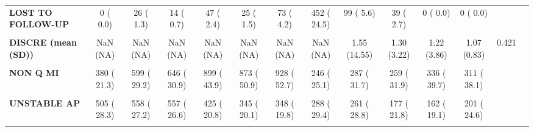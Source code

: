 \documentclass[
]{article}
\begin{document}
\begin{table}[H]
\begin{tabular}[t]{>{\raggedright\arraybackslash}p{5em}ccccccccccccc}
\textbf{LOST TO FOLLOW-UP} & 0 (  0.0) & 26 (  1.3) & 14 (  0.7) & 47 (  2.4) & 25 (  1.5) & 73 (  4.2) & 452 ( 24.5) & 99 (  5.6) & 39 (  2.7) & 0 (  0.0) & 0 (  0.0) &  & \\
\textbf{\cellcolor{gray!10}{STILL IN HOSPITAL}} & \cellcolor{gray!10}{59 (  3.7)} & \cellcolor{gray!10}{64 (  3.2)} & \cellcolor{gray!10}{41 (  2.1)} & \cellcolor{gray!10}{50 (  2.5)} & \cellcolor{gray!10}{16 (  0.9)} & \cellcolor{gray!10}{20 (  1.1)} & \cellcolor{gray!10}{22 (  1.2)} & \cellcolor{gray!10}{30 (  1.7)} & \cellcolor{gray!10}{17 (  1.2)} & \cellcolor{gray!10}{5 (  0.3)} & \cellcolor{gray!10}{8 (  0.7)} & \cellcolor{gray!10}{} & \cellcolor{gray!10}{}\\
\textbf{DISCRE (mean (SD))} & NaN (NA) & NaN (NA) & NaN (NA) & NaN (NA) & NaN (NA) & NaN (NA) & NaN (NA) & 1.55 (14.55) & 1.30 (3.22) & 1.22 (3.86) & 1.07 (0.83) & 0.421 & \\
\textbf{\cellcolor{gray!10}{DISDIA (\%)}} & \cellcolor{gray!10}{} & \cellcolor{gray!10}{} & \cellcolor{gray!10}{} & \cellcolor{gray!10}{} & \cellcolor{gray!10}{} & \cellcolor{gray!10}{} & \cellcolor{gray!10}{} & \cellcolor{gray!10}{} & \cellcolor{gray!10}{} & \cellcolor{gray!10}{} & \cellcolor{gray!10}{} & \cellcolor{gray!10}{<0.001} & \cellcolor{gray!10}{}\\
\textbf{NON Q MI} & 380 ( 21.3) & 599 ( 29.2) & 646 ( 30.9) & 899 ( 43.9) & 873 ( 50.9) & 928 ( 52.7) & 246 ( 25.1) & 287 ( 31.7) & 259 ( 31.9) & 336 ( 39.7) & 311 ( 38.1) &  & \\
\textbf{\cellcolor{gray!10}{Q WAVE MI}} & \cellcolor{gray!10}{901 ( 50.4)} & \cellcolor{gray!10}{891 ( 43.5)} & \cellcolor{gray!10}{891 ( 42.6)} & \cellcolor{gray!10}{724 ( 35.4)} & \cellcolor{gray!10}{498 ( 29.0)} & \cellcolor{gray!10}{484 ( 27.5)} & \cellcolor{gray!10}{445 ( 45.5)} & \cellcolor{gray!10}{357 ( 39.4)} & \cellcolor{gray!10}{375 ( 46.2)} & \cellcolor{gray!10}{348 ( 41.1)} & \cellcolor{gray!10}{304 ( 37.3)} & \cellcolor{gray!10}{} & \cellcolor{gray!10}{}\\
\textbf{UNSTABLE AP} & 505 ( 28.3) & 558 ( 27.2) & 557 ( 26.6) & 425 ( 20.8) & 345 ( 20.1) & 348 ( 19.8) & 288 ( 29.4) & 261 ( 28.8) & 177 ( 21.8) & 162 ( 19.1) & 201 ( 24.6) &  & \\
\textbf{\cellcolor{gray!10}{DISDIE = DECEASED (\%)}} & \cellcolor{gray!10}{94 (  5.2)} & \cellcolor{gray!10}{72 (  3.5)} & \cellcolor{gray!10}{68 (  3.2)} & \cellcolor{gray!10}{59 (  2.8)} & \cellcolor{gray!10}{44 (  2.5)} & \cellcolor{gray!10}{38 (  2.1)} & \cellcolor{gray!10}{37 (  2.0)} & \cellcolor{gray!10}{30 (  1.7)} & \cellcolor{gray!10}{52 (  2.9)} & \cellcolor{gray!10}{39 (  2.2)} & \cellcolor{gray!10}{23 (  1.3)} & \cellcolor{gray!10}{<0.001} & \cellcolor{gray!10}{}\\

\end{tabular}
\end{table}
\end{document}
